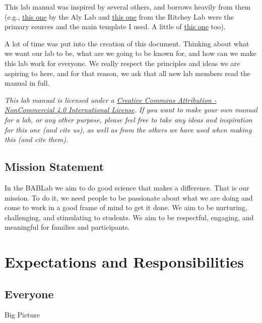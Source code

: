 \documentclass[]{book}
\begin{document}
This lab manual was inspired by several others, and borrows heavily from them (e.g., \href{https://github.com/alylab/labmanual/blob/master/aly-lab-manual.pdf}{this one} by the Aly Lab and \href{https://github.com/memobc/memolab-manual}{this one} from the Ritchey Lab were the primary sources and the main template I used. A little of \href{https://github.com/jpeelle/peellelab_manual/blob/master/peellelab_manual.pdf}{this one} too).

A lot of time was put into the creation of this document. Thinking about what we want our lab to be, what are we going to be known for, and how can we make this lab work for everyone. We really respect the principles and ideas we are aspiring to here, and for that reason, we ask that all new lab members read the manual in full.

\emph{This lab manual is licensed under a \href{https://creativecommons.org/licenses/by-nc/4.0/}{Creative Commons Attribution - NonCommercial 4.0 International License}. If you want to make your own manual for a lab, or any other purpose, please feel free to take any ideas and inspiration for this one (and cite us), as well as from the others we have used when making this (and cite them).}

\hypertarget{mission-statement}{%
\section{Mission Statement}\label{mission-statement}}

In the BABLab we aim to do good science that makes a difference. That is our mission. To do it, we need people to be passionate about what we are doing and come to work in a good frame of mind to get it done. We aim to be nurturing, challenging, and stimulating to students. We aim to be respectful, engaging, and meaningful for families and participants.

\hypertarget{expectations-and-responsibilities}{%
\chapter{Expectations and Responsibilities}\label{expectations-and-responsibilities}}

\hypertarget{everyone}{%
\section{Everyone}\label{everyone}}

Big Picture
\end{document}
